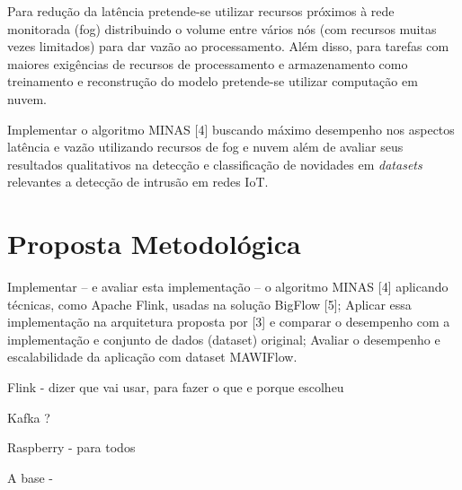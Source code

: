 Para redução da latência pretende-se utilizar recursos próximos à rede
monitorada (fog) distribuindo o volume entre vários nós (com recursos muitas
vezes limitados) para dar vazão ao processamento. Além disso, para tarefas com
maiores exigências de recursos de processamento e armazenamento como treinamento
e reconstrução do modelo pretende-se utilizar computação em nuvem.

Implementar o algoritmo MINAS [4] buscando máximo desempenho nos aspectos 
latência e vazão utilizando recursos de fog e nuvem além de avaliar seus resultados
qualitativos na detecção e classificação de novidades em \emph{datasets}
relevantes a detecção de intrusão em redes IoT.


\section{Proposta Metodológica}

Implementar  -- e avaliar esta implementação -- o algoritmo MINAS [4] 
aplicando técnicas, como Apache Flink, usadas na solução BigFlow [5];
Aplicar essa implementação na arquitetura proposta por [3] e
comparar o desempenho com a implementação e conjunto de dados (dataset) original;
Avaliar o desempenho e escalabilidade da aplicação com dataset MAWIFlow.

Flink  - dizer que vai usar, para fazer o que e porque escolheu 

Kafka ?

Raspberry - para todos

A base - 

